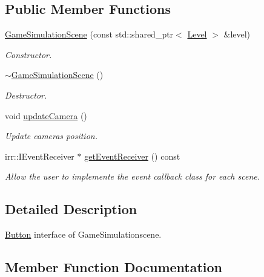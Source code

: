 \subsection*{Public Member Functions}
\begin{DoxyCompactItemize}
\item 
\mbox{\label{classGameSimulationScene_a6983b2c511d45278121bcf62151fbb19}} 
\hyperlink{classGameSimulationScene_a6983b2c511d45278121bcf62151fbb19}{Game\+Simulation\+Scene} (const std\+::shared\+\_\+ptr$<$ \hyperlink{classLevel}{Level} $>$ \&level)
\begin{DoxyCompactList}\small\item\em Constructor. \end{DoxyCompactList}\item 
\mbox{\label{classGameSimulationScene_af45f3e7f70376e59a6f320f21ce2897b}} 
\hyperlink{classGameSimulationScene_af45f3e7f70376e59a6f320f21ce2897b}{$\sim$\+Game\+Simulation\+Scene} ()
\begin{DoxyCompactList}\small\item\em Destructor. \end{DoxyCompactList}\item 
void \hyperlink{classGameSimulationScene_aae1a8d0e8d3f8b1cc51c9291b96c52ec}{update\+Camera} ()
\begin{DoxyCompactList}\small\item\em Update camera\textquotesingle{}s position. \end{DoxyCompactList}\item 
irr\+::\+I\+Event\+Receiver $\ast$ \hyperlink{classGameSimulationScene_a048b2a937caff3af7b4d54f8bd404ec1}{get\+Event\+Receiver} () const
\begin{DoxyCompactList}\small\item\em Allow the user to implemente the event callback class for each scene. \end{DoxyCompactList}\end{DoxyCompactItemize}


\subsection{Detailed Description}
\hyperlink{classButton}{Button} interface of Game\+Simulationscene. 

\subsection{Member Function Documentation}
\mbox{\label{classGameSimulationScene_a048b2a937caff3af7b4d54f8bd404ec1}} 
